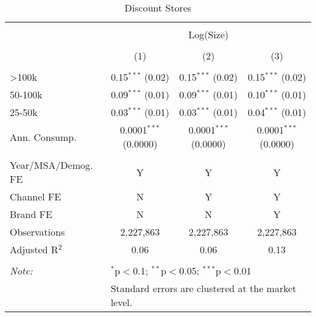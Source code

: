 
\begin{table}[!htbp] \centering 
  \caption{Discount Stores} 
  \label{tab:packageSizeDiscountSoda} 
\begin{tabular}{@{\extracolsep{5pt}}lccc} 
\\[-1.8ex]\hline 
\hline \\[-1.8ex] 
 & \multicolumn{3}{c}{Log(Size)} \\ 
\\[-1.8ex] & (1) & (2) & (3)\\ 
\hline \\[-1.8ex] 
 >100k & 0.15$^{***}$ (0.02) & 0.15$^{***}$ (0.02) & 0.15$^{***}$ (0.02) \\ 
  50-100k & 0.09$^{***}$ (0.01) & 0.09$^{***}$ (0.01) & 0.10$^{***}$ (0.01) \\ 
  25-50k & 0.03$^{***}$ (0.01) & 0.03$^{***}$ (0.01) & 0.04$^{***}$ (0.01) \\ 
  Ann. Consump. & 0.0001$^{***}$ (0.0000) & 0.0001$^{***}$ (0.0000) & 0.0001$^{***}$ (0.0000) \\ 
 \hline \\[-1.8ex] 
Year/MSA/Demog. FE & Y & Y & Y \\ 
Channel FE & N & Y & Y \\ 
Brand FE & N & N & Y \\ 
Observations & 2,227,863 & 2,227,863 & 2,227,863 \\ 
Adjusted R$^{2}$ & 0.06 & 0.06 & 0.13 \\ 
\hline 
\hline \\[-1.8ex] 
\textit{Note:}  & \multicolumn{3}{l}{$^{*}$p$<$0.1; $^{**}$p$<$0.05; $^{***}$p$<$0.01} \\ 
 & \multicolumn{3}{l}{Standard errors are clustered at the market level.} \\ 
\end{tabular} 
\end{table} 
